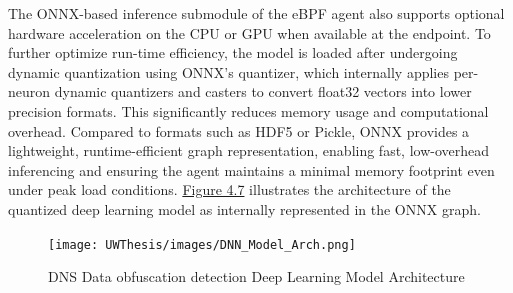\documentclass [11pt, proquest] {uwthesis}[2020/02/24]
\begin{document}
The ONNX-based inference submodule of the eBPF agent also supports optional hardware acceleration on the CPU or GPU when available at the endpoint. To further optimize run-time efficiency, the model is loaded after undergoing dynamic quantization using ONNX’s quantizer, which internally applies per-neuron dynamic quantizers and casters to convert float32 vectors into lower precision formats. This significantly reduces memory usage and computational overhead. Compared to formats such as HDF5 or Pickle, ONNX provides a lightweight, runtime-efficient graph representation, enabling fast, low-overhead inferencing and ensuring the agent maintains a minimal memory footprint even under peak load conditions. \hyperref[sec:model_arch]{Figure 4.7} illustrates the architecture of the quantized deep learning model as internally represented in the ONNX graph. 




\begin{figure}[H]
\texttt{[image: UWThesis/images/DNN\_Model\_Arch.png]}
\caption{DNS Data obfuscation detection Deep Learning Model Architecture}
\label{sec:model_arch}
\end{figure}
\end{document}
